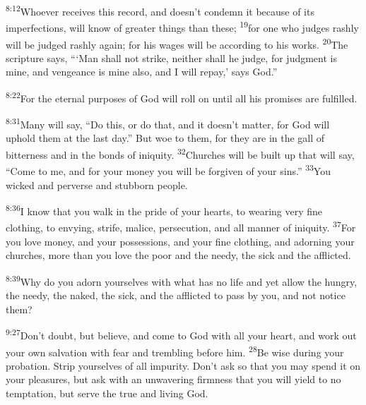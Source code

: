\documentclass[openany,12pt,english]{book}
\newenvironment{para}{\par\pretolerance=100\tolerance=200\setlength{\emergencystretch}{0.6em}\relax}{\par}
\begin{document}
\begin{para}
    \textsuperscript{8:12}\thinspace{}Who\-ev\-er receives this rec\-ord, and does\-n't con\-demn it be\-cause of its imperfections, will know of greater things than these;
    \textsuperscript{19}\thinspace{}for one who judges rash\-ly will be judged rash\-ly a\-gain; for his wages will be ac\-cord\-ing to his works.
    \textsuperscript{20}\thinspace{}The scrip\-ture says, “‘Man shall not strike, nei\-ther shall he judge, for judg\-ment is mine, and venge\-ance is mine al\-so, and I will re\-pay,’ says God.”
\end{para}

\begin{para}
    \textsuperscript{8:22}\thinspace{}For the e\-ter\-nal purposes of God will roll on un\-til all his promises are ful\-filled.
\end{para}

\bigskip{}

\begin{para}
    \textsuperscript{8:31}\thinspace{}Man\-y will say, “Do this, or do that, and it does\-n't mat\-ter, for God will up\-hold them at the last day.” But woe to them, for they are in the gall of bit\-ter\-ness and in the bonds of in\-iq\-ui\-ty.
    \textsuperscript{32}\thinspace{}Churches will be built up that will say, “Come to me, and for your mon\-ey you will be for\-giv\-en of your sins.”
    \textsuperscript{33}\thinspace{}You wick\-ed and per\-verse and stub\-born peo\-ple.
\end{para}

\begin{para}
    \textsuperscript{8:36}\thinspace{}I know that you walk in the pride of your hearts, to wear\-ing ver\-y fi\-ne cloth\-ing, to en\-vy\-ing, strife, mal\-ice, per\-se\-cu\-tion, and all man\-ner of in\-iq\-ui\-ty.
    \textsuperscript{37}\thinspace{}For you love mon\-ey, and your possessions, and your fi\-ne cloth\-ing, and adorning your churches, more than you love the poor and the needy, the sick and the afflicted.
\end{para}

\begin{para}
    \textsuperscript{8:39}\thinspace{}Why do you a\-dorn your\-selves with what has no life and yet al\-low the hun\-gry, the needy, the na\-ked, the sick, and the afflicted to pass by you, and not no\-tice them?
\end{para}

\begin{para}
    \textsuperscript{9:27}\thinspace{}Don't doubt, but be\-lieve, and come to God with all your heart, and work out your own sal\-va\-tion with fear and trem\-bling be\-fore him.
    \textsuperscript{28}\thinspace{}Be wise dur\-ing your pro\-ba\-tion. Strip your\-selves of all im\-pu\-ri\-ty. Don't ask so that you may spend it on your pleasures, but ask with an un\-wa\-ver\-ing firm\-ness that you will yield to no temp\-ta\-tion, but serve the true and liv\-ing God.
\end{para}
\end{document}
